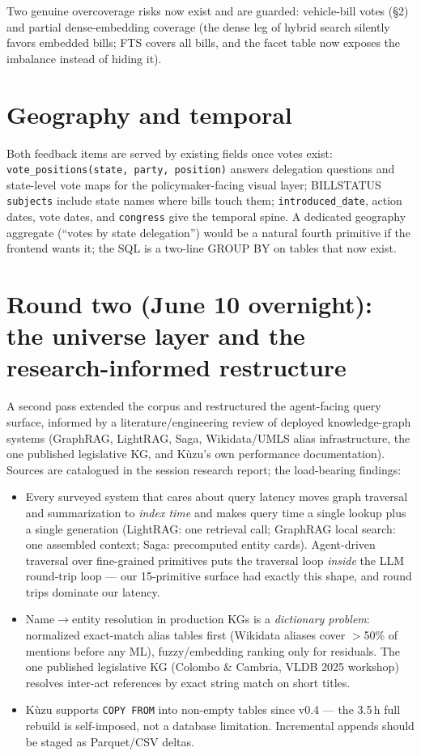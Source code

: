 \documentclass[11pt]{article}
\newcommand{\code}[1]{\texttt{#1}}
\begin{document}
Two genuine overcoverage risks now exist and are guarded: vehicle-bill
votes (\S2) and partial dense-embedding coverage (the dense leg of hybrid
search silently favors embedded bills; FTS covers all bills, and the facet
table now exposes the imbalance instead of hiding it).

\section{Geography and temporal}

Both feedback items are served by existing fields once votes exist:
\code{vote\_positions(state, party, position)} answers delegation
questions and state-level vote maps for the policymaker-facing visual
layer; BILLSTATUS \code{subjects} include state names where bills touch
them; \code{introduced\_date}, action dates, vote dates, and
\code{congress} give the temporal spine. A dedicated geography aggregate
(``votes by state delegation'') would be a natural fourth primitive if the
frontend wants it; the SQL is a two-line GROUP BY on tables that now
exist.

\section{Round two (June 10 overnight): the universe layer and the
research-informed restructure}

A second pass extended the corpus and restructured the agent-facing
query surface, informed by a literature/engineering review of deployed
knowledge-graph systems (GraphRAG, LightRAG, Saga, Wikidata/UMLS alias
infrastructure, the one published legislative KG, and K\`uzu's own
performance documentation). Sources are catalogued in the session
research report; the load-bearing findings:

\begin{itemize}[itemsep=2pt]
  \item Every surveyed system that cares about query latency moves graph
        traversal and summarization to \emph{index time} and makes query
        time a single lookup plus a single generation (LightRAG: one
        retrieval call; GraphRAG local search: one assembled context;
        Saga: precomputed entity cards). Agent-driven traversal over
        fine-grained primitives puts the traversal loop \emph{inside}
        the LLM round-trip loop --- our 15-primitive surface had exactly
        this shape, and round trips dominate our latency.
  \item Name$\to$entity resolution in production KGs is a
        \emph{dictionary problem}: normalized exact-match alias tables
        first (Wikidata aliases cover $>$50\% of mentions before any
        ML), fuzzy/embedding ranking only for residuals. The one
        published legislative KG (Colombo \& Cambria, VLDB 2025
        workshop) resolves inter-act references by exact string match on
        short titles.
  \item K\`uzu supports \code{COPY FROM} into non-empty tables since
        v0.4 --- the 3.5\,h full rebuild is self-imposed, not a database
        limitation. Incremental appends should be staged as
        Parquet/CSV deltas.
\end{itemize}
\end{document}
